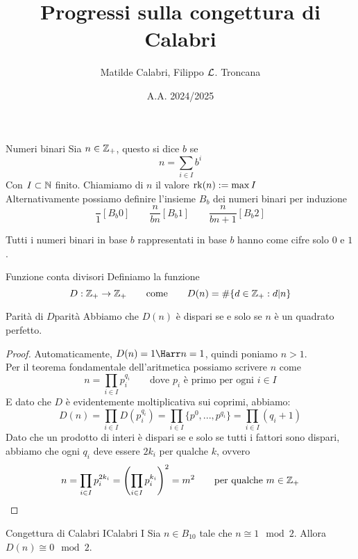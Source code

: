 \documentclass{article}
\title{Progressi sulla congettura di Calabri}
\author{Matilde Calabri, Filippo $\mathcal{L}$. Troncana}
\date{A.A. 2024/2025}
\begin{document}
\maketitle

\begin{definition}{Numeri binari}{}
    Sia $n \in \mathbb{Z}_+$, questo si dice  $b$ se 
    \[n = \sum_{i \in I} b^i\]
    Con $I \subset \mathbb{N}$ finito. Chiamiamo  di $n$ il valore $\operatorname{rk}(n) := \max{I}$\\
    Alternativamente possiamo definire l'insieme $B_b$ dei numeri binari per induzione
    \[\frac{}{1}[B_b0] \qquad \frac{n}{b n}[B_b1] \qquad \frac{n}{b n +1}[B_b2]\]
\end{definition}
\begin{remark}{}{}
    Tutti i numeri binari in base $b$ rappresentati in base $b$ hanno come cifre solo $0$ e $1$.
\end{remark}

\begin{definition}{Funzione conta divisori}{}
    Definiamo la funzione 
    \[ D : \mathbb{Z}_+ \to \mathbb{Z}_+ \qquad \text{come} \qquad D(n) = \#\{d \in \mathbb{Z}_+ : d|n\}\]
\end{definition}
\begin{lemma}{Parità di $D$}{parità}
    Abbiamo che $D(n)$ è dispari se e solo se $n$ è un quadrato perfetto.
    \begin{proof}
        Automaticamente, $D(n) = 1 \Harr n = 1$, quindi poniamo $n > 1$.\\
        Per il teorema fondamentale dell'aritmetica possiamo scrivere $n$ come
        \[n = \prod_{i \in I}p_i^{q_i} \qquad \text{dove } p_i \text{ è primo per ogni }i \in I \]
        E dato che $D$ è evidentemente moltiplicativa sui coprimi, abbiamo:
        \[D(n) = \prod_{i \in I} D(p_i^{q_i}) = \prod_{i \in I} \{p^0,...,p^{q_i}\} = \prod_{i \in I}(q_i +1)\]
        Dato che un prodotto di interi è dispari se e solo se tutti i fattori sono dispari, abbiamo che ogni $q_i$ deve essere $2k_i$ per qualche $k$, ovvero 
        \[n = \prod_{i \in I}p_i^{2k_i} = \left(\prod_{i \in I} p_i^{k_i} \right)^2 = m^2 \qquad \text{per qualche } m \in \mathbb{Z}_+\]
    \end{proof}
\end{lemma}

\begin{conjecture}{Congettura di Calabri I}{Calabri I}
    Sia $n \in B_{10}$ tale che $n \cong 1 \mod 2$. Allora $D(n) \cong 0 \mod 2$.
\end{conjecture}
\end{document}
